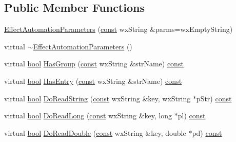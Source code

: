 \subsection*{Public Member Functions}
\begin{DoxyCompactItemize}
\item 
\hyperlink{class_effect_automation_parameters_a9fd87e7c3e3c4763ae947ac73a04ea42}{Effect\+Automation\+Parameters} (\hyperlink{getopt1_8c_a2c212835823e3c54a8ab6d95c652660e}{const} wx\+String \&parms=wx\+Empty\+String)
\item 
virtual \hyperlink{class_effect_automation_parameters_aab4289af6cbc41345e3202d86c17024a}{$\sim$\+Effect\+Automation\+Parameters} ()
\item 
virtual \hyperlink{mac_2config_2i386_2lib-src_2libsoxr_2soxr-config_8h_abb452686968e48b67397da5f97445f5b}{bool} \hyperlink{class_effect_automation_parameters_a0b3fe556bc465bd587ef6ffa20127ebc}{Has\+Group} (\hyperlink{getopt1_8c_a2c212835823e3c54a8ab6d95c652660e}{const} wx\+String \&str\+Name) \hyperlink{getopt1_8c_a2c212835823e3c54a8ab6d95c652660e}{const} 
\item 
virtual \hyperlink{mac_2config_2i386_2lib-src_2libsoxr_2soxr-config_8h_abb452686968e48b67397da5f97445f5b}{bool} \hyperlink{class_effect_automation_parameters_a3a33c0982f79e7ad7e7d16b3babe9b49}{Has\+Entry} (\hyperlink{getopt1_8c_a2c212835823e3c54a8ab6d95c652660e}{const} wx\+String \&str\+Name) \hyperlink{getopt1_8c_a2c212835823e3c54a8ab6d95c652660e}{const} 
\item 
virtual \hyperlink{mac_2config_2i386_2lib-src_2libsoxr_2soxr-config_8h_abb452686968e48b67397da5f97445f5b}{bool} \hyperlink{class_effect_automation_parameters_af0f4f44ccb9bbd3828af7a5b0942c2d7}{Do\+Read\+String} (\hyperlink{getopt1_8c_a2c212835823e3c54a8ab6d95c652660e}{const} wx\+String \&key, wx\+String $\ast$p\+Str) \hyperlink{getopt1_8c_a2c212835823e3c54a8ab6d95c652660e}{const} 
\item 
virtual \hyperlink{mac_2config_2i386_2lib-src_2libsoxr_2soxr-config_8h_abb452686968e48b67397da5f97445f5b}{bool} \hyperlink{class_effect_automation_parameters_a51b454a58961e85b5de5034a8048c174}{Do\+Read\+Long} (\hyperlink{getopt1_8c_a2c212835823e3c54a8ab6d95c652660e}{const} wx\+String \&key, long $\ast$pl) \hyperlink{getopt1_8c_a2c212835823e3c54a8ab6d95c652660e}{const} 
\item 
virtual \hyperlink{mac_2config_2i386_2lib-src_2libsoxr_2soxr-config_8h_abb452686968e48b67397da5f97445f5b}{bool} \hyperlink{class_effect_automation_parameters_aeed1eda94439224d1abfb8f39484c3c4}{Do\+Read\+Double} (\hyperlink{getopt1_8c_a2c212835823e3c54a8ab6d95c652660e}{const} wx\+String \&key, double $\ast$pd) \hyperlink{getopt1_8c_a2c212835823e3c54a8ab6d95c652660e}{const} 

\end{DoxyCompactItemize}
